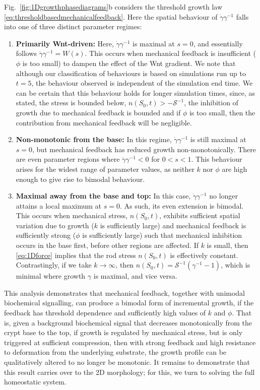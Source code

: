 Fig.\ \ref{fig:1Dgrowthphasediagrams}b considers the threshold growth law \eqref{eq:thresholdbasedmechanicalfeedback}. Here the spatial behaviour of $\dot{\gamma}\gamma^{-1}$ falls into one of three distinct parameter regimes:
\begin{enumerate}
	\item \textbf{Primarily Wnt-driven:} Here, $\dot{\gamma}{\gamma}^{-1}$ is maximal at $s = 0$, and essentially follows $\dot{\gamma}\gamma^{-1} = W(s)$. This occurs when mechanical feedback is insufficient ($\phi$ is too small) to dampen the effect of the Wnt gradient. We note that although our classification of behaviours is based on simulations run up to $t = 5$, the behaviour observed is independent of the simulation end time. We can be certain that this behaviour holds for longer simulation times, since, as stated, the stress is bounded below, $n(S_0, t) > -\mathcal{S}^{-1}$, the inhibition of growth due to mechanical feedback is bounded and if $\phi$ is too small, then the contribution from mechanical feedback will be negligible.
	\item \textbf{Non-monotonic from the base:} In this regime, $\dot{\gamma}\gamma^{-1}$ is still maximal at $s = 0$, but mechanical feedback has reduced growth non-monotonically. There are even parameter regions where $\dot{\gamma}\gamma^{-1} < 0$ for $0 < s < 1$. This behaviour arises for the widest range of parameter values, as neither $k$ nor $\phi$ are high enough to give rise to bimodal behaviour.
	\item \textbf{Maximal away from the base and top:} In this case, $\dot{\gamma}\gamma^{-1}$ no longer attains a local maximum at $s = 0$. As such, its even extension is bimodal. This occurs when mechanical stress, $n(S_0, t)$, exhibits sufficient spatial variation due to growth ($k$ is sufficiently large) and mechanical feedback is sufficiently strong ($\phi$ is sufficiently large) such that mechanical inhibition occurs in the base first, before other regions are affected.  If $k$ is small, then \eqref{eq:1Dforce} implies that the rod stress $n(S_0, t)$ is effectively constant. Contrastingly, if we take $k \to \infty$, then $n(S_0, t) = \mathcal{S}^{-1}(\gamma^{-1} - 1)$, which is minimal where growth $\gamma$ is maximal, and vice versa.
\end{enumerate}
This analysis demonstrates that mechanical feedback, together with unimodal biochemical signalling, can produce a bimodal form of incremental growth, if the feedback has threshold dependence and sufficiently high values of $k$ and $\phi$. That is, given a background biochemical signal that decreases monotonically from the crypt base to the top, if growth is regulated by mechanical stress, but is only triggered at sufficient compression, then with strong feedback and high resistance to deformation from the underlying substrate, the growth profile can be qualitatively altered to no longer be monotonic. It remains to demonstrate that this result carries over to the 2D morphology; for this, we turn to solving the full homeostatic system. 

